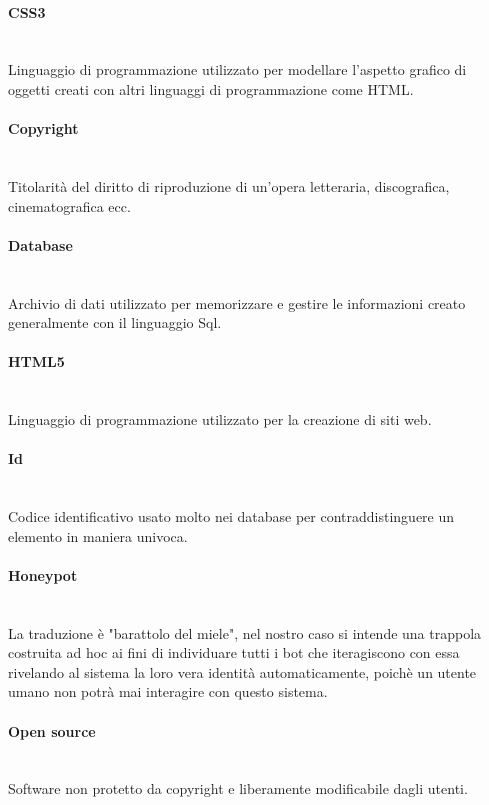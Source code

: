 \paragraph{CSS3}~\smallskip \\
Linguaggio di programmazione utilizzato per modellare l'aspetto grafico di oggetti creati con altri linguaggi di programmazione come HTML.

\paragraph{Copyright}~\smallskip \\
Titolarità del diritto di riproduzione di un'opera letteraria, discografica, cinematografica ecc.

\paragraph{Database}~\smallskip \\
Archivio di dati utilizzato per memorizzare e gestire le informazioni creato generalmente con il linguaggio Sql.

\paragraph{HTML5}~\smallskip \\
Linguaggio di programmazione utilizzato per la creazione di siti web.

\paragraph{Id}~\smallskip \\
Codice identificativo usato molto nei database per contraddistinguere un elemento in maniera univoca.

\paragraph{Honeypot}~\smallskip \\
La traduzione è "barattolo del miele", nel nostro caso si intende una trappola costruita ad hoc ai fini di individuare tutti i bot che iteragiscono con essa rivelando al sistema la loro vera identità automaticamente, poichè un utente umano non potrà mai interagire con questo sistema.

\paragraph{Open source}~\smallskip \\
Software non protetto da copyright e liberamente modificabile dagli utenti.

